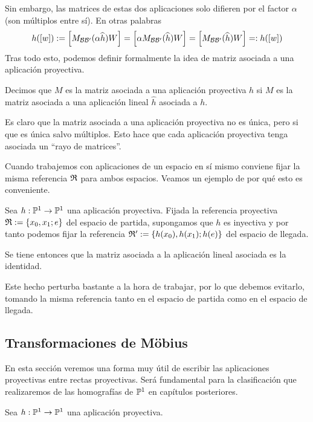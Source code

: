 Sin embargo, las matrices de estas dos aplicaciones solo difieren por el factor $\alpha$ (son múltiplos entre sí). En otras palabras
\begin{equation}h(\left [ w \right ]):=\left [ M_{\mathcal{B}\mathcal{B}'}(\alpha \widehat{h})W \right ]=\left [ \alpha M_{\mathcal{B}\mathcal{B}'}(\widehat{h})W \right ]=\left [  M_{\mathcal{B}\mathcal{B}'}(\widehat{h})W \right ]=:h(\left [ w \right ])\end{equation}
Tras todo esto, podemos definir formalmente la idea de matriz asociada a una aplicación proyectiva.
\begin{defi}
	Decimos que $M$ es la matriz asociada a una aplicación proyectiva $h$ si $M$ es la matriz asociada a una aplicación lineal $\widehat{h}$ asociada a $h$.
\end{defi}
\begin{obs}
	Es claro que la matriz asociada a una aplicación proyectiva no es única, pero si que es única salvo múltiplos. Esto hace que cada aplicación proyectiva tenga asociada un ``rayo de matrices''.
\end{obs}

Cuando trabajemos con aplicaciones de un espacio en sí mismo conviene fijar la misma referencia $\mathfrak{R}$ para ambos espacios. Veamos un ejemplo de por qué esto es conveniente.
\begin{exa}[Identidad]
	Sea $h:\mathbb{P}^1\to\mathbb{P}^1$ una aplicación proyectiva. Fijada la referencia proyectiva $\mathfrak{R}:=\{x_0,x_1;e\}$ del espacio de partida, supongamos que $h$ es inyectiva y por tanto podemos fijar la referencia $\mathfrak{R}':=\{h(x_0),h(x_1);h(e)\}$ del espacio de llegada.
	
	Se tiene entonces que la matriz asociada a la aplicación lineal asociada es la identidad.
	
	Este hecho perturba bastante a la hora de trabajar, por lo que debemos evitarlo, tomando la misma referencia tanto en el espacio de partida como en el espacio de llegada.
\end{exa}

\subsection{Transformaciones de Möbius}
En esta sección veremos una forma muy útil de escribir las aplicaciones proyectivas entre rectas proyectivas. Será fundamental para la clasificación que realizaremos de las homografías de $\mathbb{P}^1$ en capítulos posteriores.

Sea $h:\mathbb{P}^1\to\mathbb{P}^1$ una aplicación proyectiva.

